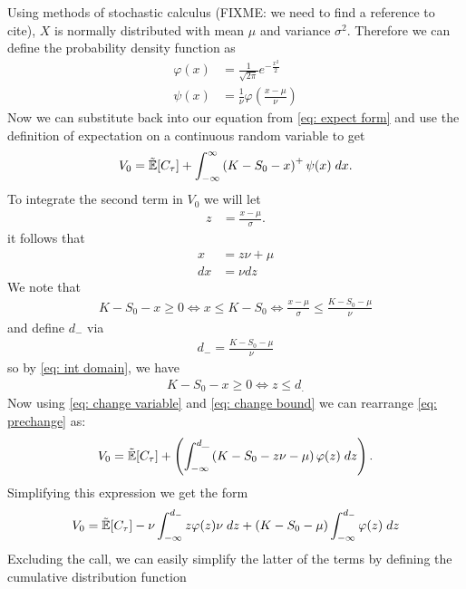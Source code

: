 \documentclass[reqno]{amsart}
\begin{document}
Using methods of stochastic calculus (FIXME: we need to find a reference to cite), $X$ is normally distributed with mean $\mu$ and variance $\sigma^2$. Therefore we can define the probability density function as
\begin{align}
     \label{eq: phi-PDF}
     \varphi(x) &=\frac{1}{\sqrt{2\pi}}e^{-\frac{x^2}{2}}\\
     \psi(x) &= \frac{1}{\nu}\varphi(\frac{x-\mu}{\nu})
\end{align}
Now we can substitute back into our equation from \eqref{eq: expect form} and use the definition of expectation on a continuous random variable to get 
\begin{align} \label{eq: prechange}
     V_0 = \tilde{\mathbb{E}}[C_\tau] + \int_{-\infty}^{\infty}\left(K- S_0 - x\right)^+ \psi(x) \; dx.
\end{align}
To integrate the second term in $V_0$ we will let
\begin{align}
     z &= \frac{x-\mu}{\sigma}.
\end{align}
it follows that 
\begin{align}\label{eq: change variable}
     x &= z\nu + \mu\\
     dx &= \nu dz
\end{align}
We note that 
\begin{align} \label{eq: int domain}
    K - S_0 - x \ge 0 \Longleftrightarrow x \leq K- S_0 \Longleftrightarrow  \frac{x-\mu}{\sigma} \leq \frac{K-S_0-\mu}{\nu}
\end{align}
and define $d_-$ via
\begin{align}
      d_- =  \frac{K-S_0-\mu}{\nu}
\end{align}
so by \eqref{eq: int domain}, we have 
\begin{align} \label{eq: change bound}
     K - S_0 - x \ge 0  \Longleftrightarrow z \leq d_.
\end{align}
Now using \eqref{eq: change variable} and \eqref{eq: change bound} we can rearrange \eqref{eq: prechange} as:
\begin{align}
     V_0 = \tilde{\mathbb{E}}[C_\tau] + \left(\int_{-\infty}^{d\_}\left(K- S_0 - z\nu - \mu\right)\varphi(z) \; dz\right).
\end{align}
Simplifying this expression we get the form
\begin{align}
     V_0 = \tilde{\mathbb{E}}[C_\tau] - \nu \int_{-\infty}^{d_-}z\varphi(z)\nu \; dz +  (K- S_0 - \mu)\int_{-\infty}^{d_-}\varphi(z) \; dz 
\end{align}
Excluding the call, we can easily simplify the latter of the terms by defining the cumulative distribution function
\end{document}
